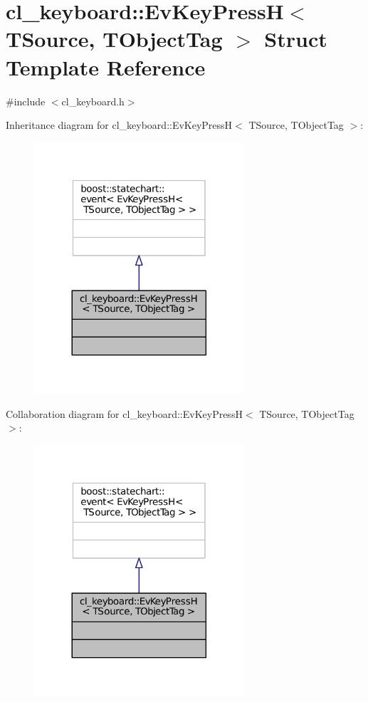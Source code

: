 \hypertarget{structcl__keyboard_1_1EvKeyPressH}{}\section{cl\+\_\+keyboard\+:\+:Ev\+Key\+PressH$<$ T\+Source, T\+Object\+Tag $>$ Struct Template Reference}
\label{structcl__keyboard_1_1EvKeyPressH}


{\ttfamily \#include $<$cl\+\_\+keyboard.\+h$>$}



Inheritance diagram for cl\+\_\+keyboard\+:\+:Ev\+Key\+PressH$<$ T\+Source, T\+Object\+Tag $>$\+:
\nopagebreak
\begin{figure}[H]
\begin{center}
\leavevmode
\includegraphics[width=221pt]{structcl__keyboard_1_1EvKeyPressH__inherit__graph}
\end{center}
\end{figure}


Collaboration diagram for cl\+\_\+keyboard\+:\+:Ev\+Key\+PressH$<$ T\+Source, T\+Object\+Tag $>$\+:
\nopagebreak
\begin{figure}[H]
\begin{center}
\leavevmode
\includegraphics[width=221pt]{structcl__keyboard_1_1EvKeyPressH__coll__graph}
\end{center}
\end{figure}


